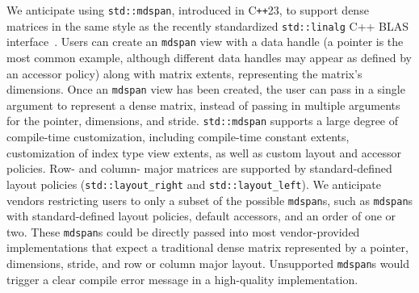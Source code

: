 \documentclass{article}
\newcommand{\JimD}[1]{{\color{red}(Jim D) #1}}
\newcommand{\cppstd}[1]{C\texttt{++}#1\xspace}
\begin{document}
We anticipate using \texttt{std::mdspan}, introduced in \cppstd{23}, to support dense matrices in the same style as the recently standardized \texttt{std::linalg} C++ BLAS interface~\cite{cpplinalg:p1673r13}.  Users can create an \texttt{mdspan} view with a data handle (a pointer is the most common example, although different data handles may appear as defined by an accessor policy) along with matrix extents, representing the matrix's dimensions.  Once an \texttt{mdspan} view has been created, the user can pass in a single argument to represent a dense matrix, instead of passing in multiple arguments for the pointer, dimensions, and stride.  \texttt{std::mdspan} supports a large degree of compile-time customization, including compile-time constant extents, customization of index type view extents, as well as custom layout and accessor policies.  Row- and column- major matrices are supported by standard-defined layout policies (\texttt{std::layout\_right} and \texttt{std::layout\_left}).  We anticipate vendors restricting users to only a subset of the possible \texttt{mdspan}s, such as \texttt{mdspan}s with standard-defined layout policies, default accessors, and an order of one or two.  These \texttt{mdspan}s could be directly passed into most vendor-provided implementations that expect a traditional dense matrix represented by a pointer, dimensions, stride, and row or column major layout.  Unsupported \texttt{mdspan}s would trigger a clear compile error message in a high-quality implementation.



\end{document}
